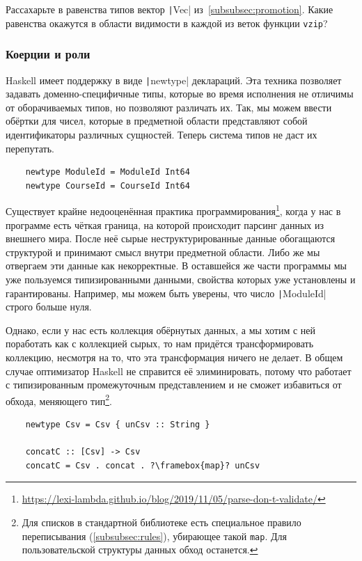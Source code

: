 \begin{task}
    Рассахарьте в равенства типов вектор \texttt|Vec| из~\ref{subsubsec:promotion}.
    Какие равенства окажутся в области видимости в каждой из веток функции \texttt{vzip}?
\end{task}

\subsubsection{Коерции и роли} \label{subsubsec:coercions}

Haskell имеет поддержку  в виде \texttt|newtype| деклараций.
Эта техника позволяет задавать доменно-специфичные типы, которые во время исполнения не отличимы от оборачиваемых типов, но позволяют различать их.
Так, мы можем ввести обёртки для чисел, которые в предметной области представляют собой идентификаторы различных сущностей.
Теперь система типов не даст их перепутать.
\begin{verbatim}
    newtype ModuleId = ModuleId Int64
    newtype CourseId = CourseId Int64
\end{verbatim}

Существует крайне недооценённая практика программирования\footnote{\url{https://lexi-lambda.github.io/blog/2019/11/05/parse-don-t-validate/}}, когда у нас в программе есть чёткая граница, на которой происходит парсинг данных из внешнего мира.
После неё сырые неструктурированные данные обогащаются структурой и принимают смысл внутри предметной области.
Либо же мы отвергаем эти данные как некорректные.
В оставшейся же части программы мы уже пользуемся типизированными данными, свойства которых уже установлены и гарантированы.
Например, мы можем быть уверены, что число \texttt|ModuleId| строго больше нуля.

Однако, если у нас есть коллекция обёрнутых данных, а мы хотим с ней поработать как с коллекцией сырых, то нам придётся трансформировать коллекцию, несмотря на то, что эта трансформация ничего не делает.
В общем случае оптимизатор Haskell не справится её элиминировать, потому что работает с типизированным промежуточным представлением и не сможет избавиться от обхода, меняющего тип\footnote{Для списков в стандартной библиотеке есть специальное правило переписывания (\ref{subsubsec:rules}), убирающее такой \texttt{map}. Для пользовательской структуры данных обход останется.}.
\begin{verbatim}
    newtype Csv = Csv { unCsv :: String }

    concatC :: [Csv] -> Csv
    concatC = Csv . concat . ?\framebox{map}? unCsv
\end{verbatim}

